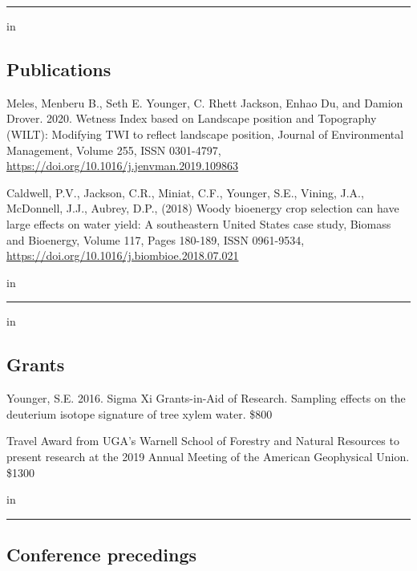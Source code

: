 \documentclass[10pt,letterpaper]{article}
\begin{document}
\pagebreak

\hrule
\vspace{-0.4em}
 in
\subsection*{Publications}

\begin{hangparas}{.25in}{1}

Meles, Menberu B., Seth E. Younger, C. Rhett Jackson, Enhao Du, and Damion Drover. 2020. Wetness Index based on Landscape position and Topography (WILT): Modifying TWI to reflect landscape position, Journal of Environmental Management, Volume 255, ISSN 0301-4797, \url{https://doi.org/10.1016/j.jenvman.2019.109863}

Caldwell, P.V., Jackson, C.R., Miniat, C.F., Younger, S.E., Vining, J.A., McDonnell, J.J., Aubrey, D.P., (2018) Woody bioenergy crop selection can have large effects on water yield: A southeastern United States case study,
Biomass and Bioenergy, Volume 117, Pages 180-189, ISSN 0961-9534, \url{https://doi.org/10.1016/j.biombioe.2018.07.021}

 in
\vspace{-0.4em}

\end{hangparas}

\hrule
\vspace{-0.4em}
 in
\subsection*{Grants}

\begin{hangparas}{.25in}{1}

Younger, S.E. 2016. Sigma Xi Grants-in-Aid of Research. Sampling effects on the deuterium isotope signature of tree xylem water. \$800

Travel Award from UGA's Warnell School of Forestry and Natural Resources to present research at the 2019 Annual Meeting of the American Geophysical Union. \$1300

 in
\vspace{-0.4em}

\end{hangparas}

\hrule
\vspace{-0.4em}
\vskip 0.2in
\subsection*{Conference precedings}
\end{document}
